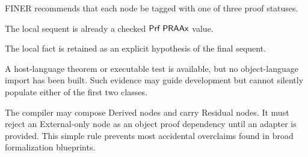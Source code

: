 FINER recommends that each node be tagged with one of three proof statuses.

\begin{description}[leftmargin=3em,style=nextline]
\item[Derived.] The local sequent is already a checked \(\mathsf{Prf}\;\mathsf{PRAAx}\) value.
\item[Residual.] The local fact is retained as an explicit hypothesis of the final sequent.
\item[External only.] A host-language theorem or executable test is available, but no object-language import has been built.  Such evidence may guide development but cannot silently populate either of the first two classes.
\end{description}

The compiler may compose Derived nodes and carry Residual nodes.  It must reject an External-only node as an object proof dependency until an adapter is provided.  This simple rule prevents most accidental overclaims found in broad formalization blueprints.
